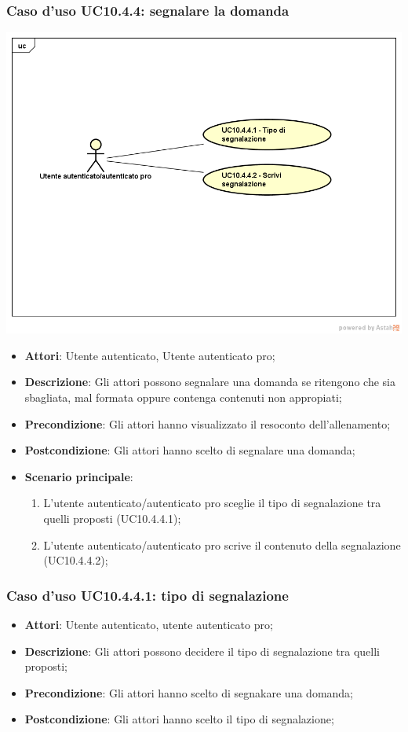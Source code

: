 \subsubsection{Caso d'uso UC10.4.4: segnalare la domanda}
\begin{center}
	\includegraphics[scale=0.5]{UML/UC10_4_4.png}
\end{center}
	\begin{itemize}
		\item \textbf{Attori}: Utente autenticato, Utente autenticato pro;
		\item \textbf{Descrizione}: Gli attori possono segnalare una domanda se ritengono che sia sbagliata, mal formata oppure contenga contenuti non appropiati;
		\item \textbf{Precondizione}: Gli attori hanno visualizzato il resoconto dell'allenamento;
		\item \textbf{Postcondizione}: Gli attori hanno scelto di segnalare una domanda;
				\item \textbf{Scenario principale}:
				\begin{enumerate}
					\item L'utente autenticato/autenticato pro sceglie il tipo di segnalazione tra quelli proposti (UC10.4.4.1);
					\item L'utente autenticato/autenticato pro scrive il contenuto della segnalazione (UC10.4.4.2);
				\end{enumerate}
	\end{itemize}
\subsubsection{Caso d'uso UC10.4.4.1: tipo di segnalazione}
	\begin{itemize}
		\item \textbf{Attori}: Utente autenticato, utente autenticato pro;
		\item \textbf{Descrizione}: Gli attori possono decidere il tipo di segnalazione tra quelli proposti;
		\item \textbf{Precondizione}: Gli attori hanno scelto di segnakare una domanda;
		\item \textbf{Postcondizione}: Gli attori hanno scelto il tipo di segnalazione;
	\end{itemize}
